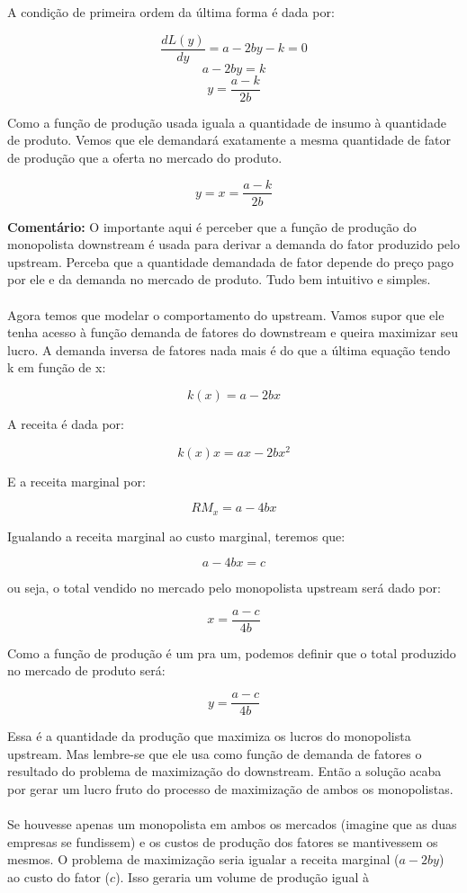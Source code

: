 \documentclass[a4paper,11pt,oneside]{book}
\theoremstyle{definition}
\theoremstyle{break}
\begin{document}
A condição de primeira ordem da última forma é dada por:

$$ \frac{d L(y)}{d y} = a - 2by - k = 0 $$
$$ a - 2by = k $$
$$ y = \frac{a - k}{2b} $$

Como a função de produção usada iguala a quantidade de insumo à quantidade de produto. Vemos que ele demandará exatamente a mesma quantidade de fator de produção que a oferta no mercado do produto.

$$ y = x = \frac{a - k}{2b} $$

\textbf{Comentário:} O importante aqui é perceber que a função de produção do monopolista downstream é usada para derivar a demanda do fator produzido pelo upstream. Perceba que a quantidade demandada de fator depende do preço pago por ele e da demanda no mercado de produto. Tudo bem intuitivo e simples.
\\
\\
Agora temos que modelar o comportamento do upstream. Vamos supor que ele tenha acesso à função demanda de fatores do downstream e queira maximizar seu lucro. A demanda inversa de fatores nada mais é do que a última equação tendo k em função de x:

$$ k(x) = a - 2bx $$

A receita é dada por:

$$ k(x)x = ax - 2bx^2 $$

E a receita marginal por:

$$ RM_x = a - 4bx $$

Igualando a receita marginal ao custo marginal, teremos que:

$$ a - 4bx = c $$

ou seja, o total vendido no mercado pelo monopolista upstream será dado por:

$$ x = \frac{a - c}{4b} $$

Como a função de produção é um pra um, podemos definir que o total produzido no mercado de produto será:

$$ y = \frac{a - c}{4b} $$

Essa é a quantidade da produção que maximiza os lucros do monopolista upstream. Mas lembre-se que ele usa como função de demanda de fatores o resultado do problema de maximização do downstream. Então a solução acaba por gerar um lucro fruto do processo de maximização de ambos os monopolistas.
\\
\\
Se houvesse apenas um monopolista em ambos os mercados (imagine que as duas empresas se fundissem) e os custos de produção dos fatores se mantivessem os mesmos. O problema de maximização seria igualar a receita marginal ($a - 2by$) ao custo do fator ($c$). Isso geraria um volume de produção igual à
\end{document}

